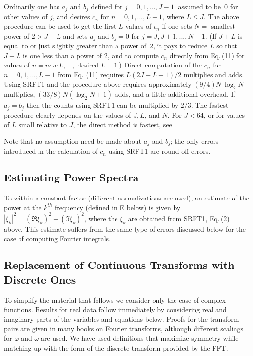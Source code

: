 \documentclass[twoside]{MATH77}
\begin{document}
Ordinarily one has $a_j$ and $b_j$ defined for $j=0,1,...,J-1$,
assumed to be~0 for other values of $j$, and desires $c_n$ for
$n=0,1,...,L-1$, where $L\leq J$. The above procedure can be used to
get the first $L$ values of $c_n $ if one sets $N=$ smallest power of
$2>J+L$ and sets $a_j$ and $b_j=0$ for $j=J,J+1,...,N-1.$ (If $J+L$
is equal to or just slightly greater than a power of~2, it pays to
reduce $L$ so that $J+L$ is one less than a power of 2, and to
compute $c_n$ directly from Eq.\,(11) for values of $n=new\ L,...,$
desired $L-1$.) Direct computation of the $c_n$ for $n=0,1,...,L-1$
from Eq.  (11) requires $L(2J-L+1)/2$ multiplies and adds. Using
SRFT1 and the procedure above requires approximately $(9/4)N\ \log
_2N$ multiplies, $(33/8)N(\log _2N+1)$ adds, and a little additional
overhead. If $a_j=b_j$ then the counts using SRFT1 can be multiplied
by $2/3$. The fastest procedure clearly depends on the values of
$J,L$, and $N$. For $J<64$, or for values of $L$ small relative to
$J$, the direct method is fastest, see \cite{Cooley:1966:AFF}.

Note that no assumption need be made about $a_j$ and $b_j$; the only
errors introduced in the calculation of $c_n$ using SRFT1 are
round-off errors.

\subsection{Estimating Power Spectra}

To within a constant factor (different normalizations are used), an
estimate of the power at the $k^{th}$ frequency (defined in E below)
is given by $|\xi _k|^2=(\Re \xi _k)^2+(\Im \xi _k)^2$, where the
$\xi _k$ are obtained from SRFT1, Eq.\,(2) above. This estimate
suffers from the same type of errors discussed below for the case of
computing Fourier integrals.

\subsection{Replacement of Continuous Transforms with Discrete Ones}

To simplify the material that follows we consider only the case of
complex functions. Results for real data follow immediately by
considering real and imaginary parts of the variables and equations
below. Proofs for the transform pairs are given in many books on
Fourier transforms, although different scalings for $\varphi $ and
$\omega $ are used.  We have used definitions that maximize symmetry
while matching up with the form of the discrete transform provided by
the FFT.
\end{document}
